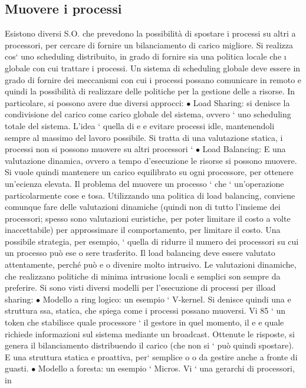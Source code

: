 \documentclass[a4paper,12pt]{article}
\begin{document}
\subsection{Muovere i processi}
Esistono diversi S.O. che prevedono la possibilità di spostare i processi su altri
a
processori, per cercare di fornire un bilanciamento di carico migliore. Si realizza
cos` uno scheduling distribuito, in grado di fornire sia una politica locale che
\i{}
globale con cui trattare i processi. Un sistema di scheduling globale deve essere
in grado di fornire dei meccanismi con cui i processi possano comunicare in
remoto e quindi la possibilità di realizzare delle politiche per la gestione delle
a
risorse.
In particolare, si possono avere due diversi approcci:
$\bullet$ Load Sharing: si denisce la condivisione del carico come carico globale
del sistema, ovvero ` uno scheduling totale del sistema. L'idea ` quella di
e
e
evitare processi idle, mantenendoli sempre al massimo del lavoro possibile.
Si tratta di una valutazione statica, i processi non si possono muovere su
altri processori
`
$\bullet$ Load Balancing: E una valutazione dinamica, ovvero a tempo d'esecuzione
le risorse si possono muovere. Si vuole quindi mantenere un carico equilibrato su ogni processore, per ottenere
un'ecienza elevata.
Il problema del muovere un processo ` che ` un'operazione particolarmente cose
e
tosa. Utilizzando una politica di load balancing, conviene comunque fare delle
valutazioni dinamiche (quindi non di tutto l'insieme dei processori; spesso sono
valutazioni euristiche, per poter limitare il costo a volte inaccettabile) per approssimare il comportamento, per
limitare il costo. Una possibile strategia, per
esempio, ` quella di ridurre il numero dei processori su cui un processo può ese
o
sere trasferito. Il load balancing deve essere valutato attentamente, perché può
e o
divenire molto intrusivo. Le valutazioni dinamiche, che realizzano politiche di
minima intrusione locali e semplici son sempre da preferire.
Si sono visti diversi modelli per l'esecuzione di processi per ilload sharing:
$\bullet$ Modello a ring logico: un esempio ` V-kernel. Si denisce quindi una
e
struttura ssa, statica, che spiega come i processi possano muoversi. Vi
85
` un token che stabilisce quale processore ` il gestore in quel momento, il
e
e
quale richiede informazioni sul sistema mediante un broadcast. Ottenute
le risposte, si genera il bilanciamento distribuendo il carico (che non si
`
può quindi spostare). E una struttura statica e proattiva, per` semplice
o
o
da gestire anche a fronte di guasti.
$\bullet$ Modello a foresta: un esempio ` Micros. Vi ` una gerarchi di processori, in
\end{document}
